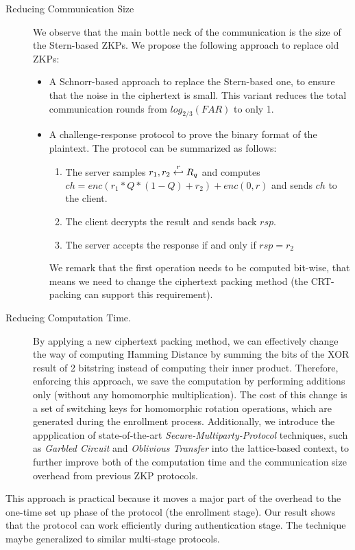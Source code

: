 \begin{description}
\item[Reducing Communication Size] We observe that the main bottle neck of the
  communication is the size of the Stern-based ZKPs. We propose the
  following approach to replace old ZKPs:
  \begin{itemize}
  \item A Schnorr-based approach to replace the Stern-based one, to ensure that the
    noise in the ciphertext is small. This variant reduces the total
    communication rounds from \(log_{2/3}(FAR)\) to only 1.
  \item A challenge-response protocol to prove the binary format of the
    plaintext. The protocol can be summarized as follows:
    \begin{enumerate}
    \item The server samples \(r_{1}, r_{2} \stackrel{r}{\hookleftarrow} R_{q}\) and computes
      \(ch = enc(r_{1}*Q*(1-Q) + r_{2}) + enc(0,r)\) and sends \(ch\) to the
      client.
    \item The client decrypts the result and sends back \(rsp\).
    \item The server accepts the response if and only if \(rsp = r_{2} \)
    \end{enumerate}
    We remark that the first operation needs to be computed bit-wise, that means
    we need to change the ciphertext packing method (the CRT-packing
    \cite{smart2014fully} can support this requirement).
  \end{itemize}
\item[Reducing Computation Time.] By applying a new ciphertext packing
  method, we can effectively change the way of computing Hamming Distance by
  summing the bits of the XOR result of 2 bitstring instead of computing their
  inner product. Therefore, enforcing this approach, we save the computation by performing
  additions only (without any homomorphic multiplication). The cost of this change
  is a set of switching keys for homomorphic rotation operations, which are
  generated during the enrollment process. Additionally, we introduce the
  appplication of state-of-the-art \textit{Secure-Multiparty-Protocol}
  techniques, such as \textit{Garbled Circuit} and \textit{Oblivious Transfer} into
  the lattice-based context, to further improve both of the computation time and
  the communication size overhead from previous ZKP protocols.
\end{description}
This approach is practical because it moves a major part of the overhead to the
one-time set up phase of the protocol (the enrollment stage). Our result shows
that the protocol can work efficiently during authentication stage. The
technique maybe generalized to similar multi-stage protocols.

